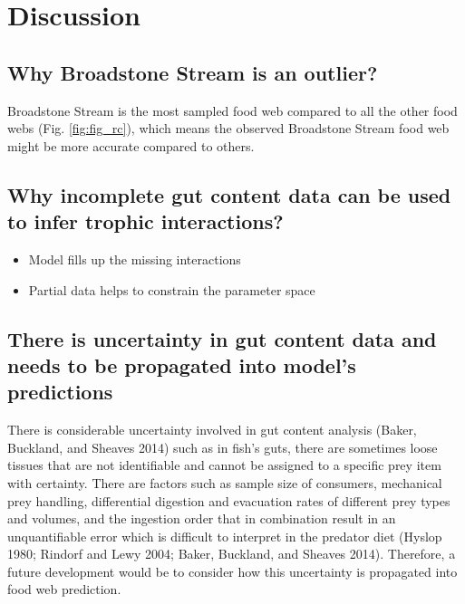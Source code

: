 \documentclass{article}
\begin{document}
\hypertarget{discussion}{%
\section{Discussion}\label{discussion}}

\hypertarget{why-broadstone-stream-is-an-outlier}{%
\subsection{Why Broadstone Stream is an
outlier?}\label{why-broadstone-stream-is-an-outlier}}

Broadstone Stream is the most sampled food web compared to all the other
food webs (Fig. \ref{fig:fig_rc}), which means the observed Broadstone
Stream food web might be more accurate compared to others.

\hypertarget{why-incomplete-gut-content-data-can-be-used-to-infer-trophic-interactions}{%
\subsection{Why incomplete gut content data can be used to infer trophic
interactions?}\label{why-incomplete-gut-content-data-can-be-used-to-infer-trophic-interactions}}

\begin{itemize}
\item
  Model fills up the missing interactions
\item
  Partial data helps to constrain the parameter space
\end{itemize}

\hypertarget{there-is-uncertainty-in-gut-content-data-and-needs-to-be-propagated-into-models-predictions}{%
\subsection{There is uncertainty in gut content data and needs to be
propagated into model's
predictions}\label{there-is-uncertainty-in-gut-content-data-and-needs-to-be-propagated-into-models-predictions}}

There is considerable uncertainty involved in gut content analysis
(Baker, Buckland, and Sheaves 2014) such as in fish's guts, there are
sometimes loose tissues that are not identifiable and cannot be assigned
to a specific prey item with certainty. There are factors such as sample
size of consumers, mechanical prey handling, differential digestion and
evacuation rates of different prey types and volumes, and the ingestion
order that in combination result in an unquantifiable error which is
difficult to interpret in the predator diet (Hyslop 1980; Rindorf and
Lewy 2004; Baker, Buckland, and Sheaves 2014). Therefore, a future
development would be to consider how this uncertainty is propagated into
food web prediction.
\end{document}
